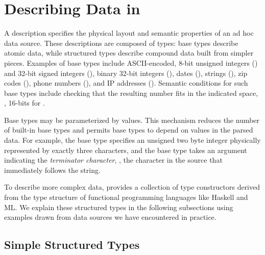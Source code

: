 \newcommand{\pvalue}{???}
\section{Describing Data in \padsmlbig{}}
\label{sec:padsml-overview}
A \padsml{} description specifies the physical layout and semantic
properties of an ad hoc data source.  These descriptions are composed
of types: base types describe atomic data, while structured types
describe compound data built from simpler pieces.  Examples of base
types include ASCII-encoded, 8-bit unsigned integers () and
32-bit signed integers (), binary 32-bit integers (),
dates (), strings (), zip codes (),
phone numbers (), and IP addresses ().  Semantic
conditions for such base types include checking 
that the resulting number fits in the indicated space, \ie, 16-bits
for .

Base types may be parameterized by \ml{} values.  This mechanism
reduces the number of built-in base types and permits base types to
depend on values in the parsed data.  For example, the base type
 specifies an unsigned two byte integer physically
represented by exactly three characters, and the base type
 takes an argument indicating the \textit{terminator
character}, \ie{}, the character in the source that immediately
follows the string.

To describe more complex data, \padsml{} provides a collection of type
constructors derived from the type structure of functional programming
languages like Haskell and ML.  We explain these structured types in
the following subsections using examples drawn from data sources we
have encountered in practice.


\subsection{Simple Structured Types}


